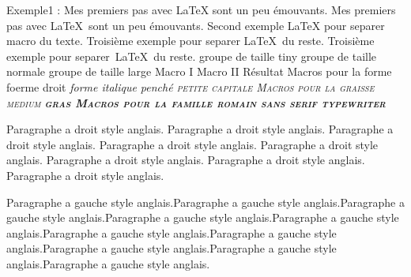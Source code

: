 \documentclass{report}
\begin{document}
Exemple1 :
Mes premiers pas avec \LaTeX{} sont un peu émouvants.
Mes premiers pas avec \LaTeX{}~sont un peu émouvants.
Second exemple {\LaTeX} pour separer macro du texte.
Troisième exemple pour separer \LaTeX\ du reste.
Troisième exemple pour separer~\LaTeX\ du reste.
{\tiny groupe de taille tiny}
{\normalsize groupe de taille normale}
{\large groupe de taille large}
Macro I  Macro II            Résultat
           Macros pour la forme
\textup \upshape foerme droit
\textit \itshape forme italique
\textsl \slshape penché
\textsc \scshape petite capitale
          Macros pour la graisse
\textmd \mdseries medium
\textbf \bfseries gras
          Macros pour la famille
\textrm \rmfamily romain
\textsf \sffamily sans serif
\texttt \ttfamily typewriter



\begin{flushright} %
Paragraphe a droit style anglais. Paragraphe a droit style anglais. Paragraphe a droit style anglais. Paragraphe a droit style anglais. Paragraphe a droit style anglais. Paragraphe a droit style anglais. Paragraphe a droit style anglais. Paragraphe a droit style anglais.
\end{flushright}

\begin{flushleft} %
Paragraphe a gauche style anglais.Paragraphe a gauche style anglais.Paragraphe a gauche style anglais.Paragraphe a gauche style anglais.Paragraphe a gauche style anglais.Paragraphe a gauche style anglais.Paragraphe a gauche style anglais.Paragraphe a gauche style anglais.Paragraphe a gauche style anglais.Paragraphe a gauche style anglais.
\end{flushleft}
\end{document}
